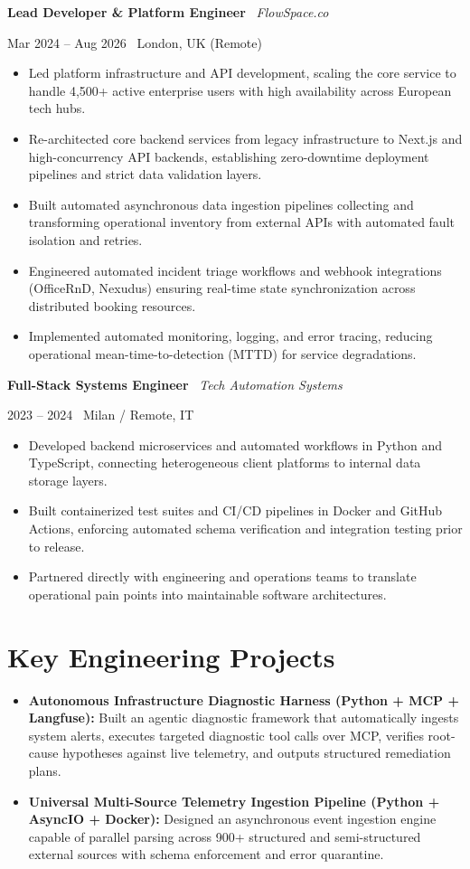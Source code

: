 \documentclass[a4paper,10pt]{article}
\newcommand{\role}[4]{%
  \vspace{2pt}\noindent
  \begin{minipage}[t]{0.70\textwidth}\raggedright\textbf{#1} \textbullet\ \textit{#3}\end{minipage}%
  \hfill
  \begin{minipage}[t]{0.28\textwidth}\raggedleft\footnotesize\color{gray}#2 \textbullet\ #4\end{minipage}%
  \vspace{1pt}%
}
\begin{document}
\vspace{3pt}
\role{Lead Developer \& Platform Engineer}{Mar 2024 -- Aug 2026}{FlowSpace.co}{London, UK (Remote)}
\begin{itemize}
  \item Led platform infrastructure and API development, scaling the core service to handle 4,500+ active enterprise users with high availability across European tech hubs.
  \item Re-architected core backend services from legacy infrastructure to Next.js and high-concurrency API backends, establishing zero-downtime deployment pipelines and strict data validation layers.
  \item Built automated asynchronous data ingestion pipelines collecting and transforming operational inventory from external APIs with automated fault isolation and retries.
  \item Engineered automated incident triage workflows and webhook integrations (OfficeRnD, Nexudus) ensuring real-time state synchronization across distributed booking resources.
  \item Implemented automated monitoring, logging, and error tracing, reducing operational mean-time-to-detection (MTTD) for service degradations.
\end{itemize}

\vspace{3pt}
\role{Full-Stack Systems Engineer}{2023 -- 2024}{Tech Automation Systems}{Milan / Remote, IT}
\begin{itemize}
  \item Developed backend microservices and automated workflows in Python and TypeScript, connecting heterogeneous client platforms to internal data storage layers.
  \item Built containerized test suites and CI/CD pipelines in Docker and GitHub Actions, enforcing automated schema verification and integration testing prior to release.
  \item Partnered directly with engineering and operations teams to translate operational pain points into maintainable software architectures.
\end{itemize}

\section{Key Engineering Projects}
\begin{itemize}
  \item \textbf{Autonomous Infrastructure Diagnostic Harness (Python + MCP + Langfuse):} Built an agentic diagnostic framework that automatically ingests system alerts, executes targeted diagnostic tool calls over MCP, verifies root-cause hypotheses against live telemetry, and outputs structured remediation plans.
  \item \textbf{Universal Multi-Source Telemetry Ingestion Pipeline (Python + AsyncIO + Docker):} Designed an asynchronous event ingestion engine capable of parallel parsing across 900+ structured and semi-structured external sources with schema enforcement and error quarantine.
\end{itemize}
\end{document}
